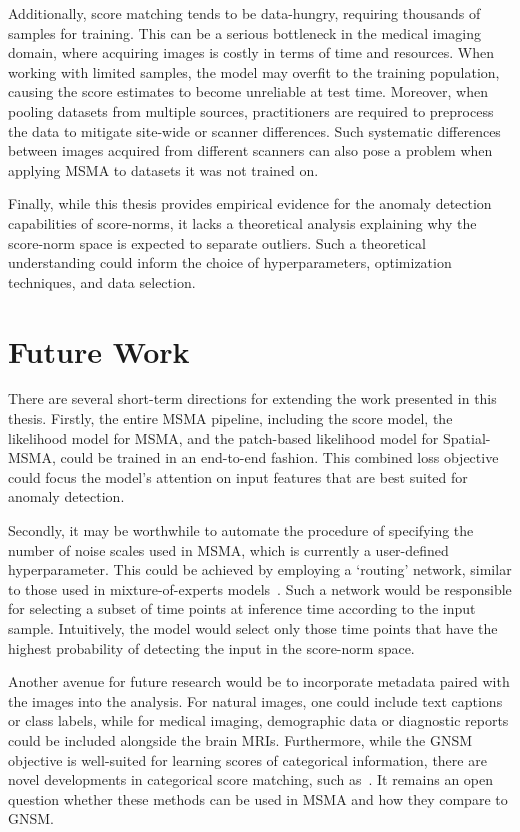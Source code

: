 Additionally, score matching tends to be data-hungry, requiring thousands of samples for training. This can be a serious bottleneck in the medical imaging domain, where acquiring images is costly in terms of time and resources. When working with limited samples, the model may overfit to the training population, causing the score estimates to become unreliable at test time. Moreover, when pooling datasets from multiple sources, practitioners are required to preprocess the data to mitigate site-wide or scanner differences. Such systematic differences between images acquired from different scanners can also pose a problem when applying MSMA to datasets it was not trained on.

Finally, while this thesis provides empirical evidence for the anomaly detection capabilities of score-norms, it lacks a theoretical analysis explaining why the score-norm space is expected to separate outliers. Such a theoretical understanding could inform the choice of hyperparameters, optimization techniques, and data selection.


\section{Future Work}

There are several short-term directions for extending the work presented in this thesis. Firstly, the entire MSMA pipeline, including the score model, the likelihood model for MSMA, and the patch-based likelihood model for Spatial-MSMA, could be trained in an end-to-end fashion. This combined loss objective could focus the model's attention on input features that are best suited for anomaly detection.

Secondly, it may be worthwhile to automate the procedure of specifying the number of noise scales used in MSMA, which is currently a user-defined hyperparameter. This could be achieved by employing a `routing' network, similar to those used in mixture-of-experts models~\cite{zoph2022stmoe}. Such a network would be responsible for selecting a subset of time points at inference time according to the input sample. Intuitively, the model would select only those time points that have the highest probability of detecting the input in the score-norm space.

Another avenue for future research would be to incorporate metadata paired with the images into the analysis. For natural images, one could include text captions or class labels, while for medical imaging, demographic data or diagnostic reports could be included alongside the brain MRIs. Furthermore, while the GNSM objective is well-suited for learning scores of categorical information, there are novel developments in categorical score matching, such as~\cite{graves2024bayesian,lou2024discrete}. It remains an open question whether these methods can be used in MSMA and how they compare to GNSM.

